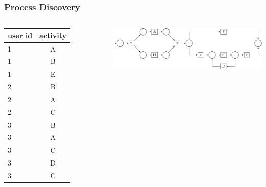 \documentclass{beamer}
\begin{document}
\begin{frame}
\frametitle{Process Discovery}
\begin{columns}
\begin{tabular}{l|c}
 user id & activity\\
 \hline
 1 & A\\
  1 & B\\
 1 & E\\
 2 & B\\
  2 & A\\
 2 & C\\
 3 & B\\
  3 & A\\
 3 & C\\
 3 & D\\
 3 & C\\
 \end{tabular}
\includegraphics[width=0.8\linewidth]{img/petri-net.pdf}
\end{columns}
\end{frame}

\end{document}
